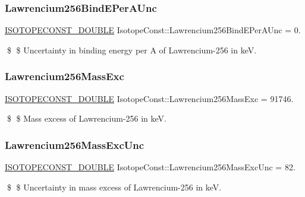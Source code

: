 \subsubsection{\texorpdfstring{Lawrencium256\+Bind\+E\+Per\+A\+Unc}{Lawrencium256BindEPerAUnc}}
{\footnotesize\ttfamily \mbox{\hyperlink{group___isotope_const-_macros_ga8f45a7272ce02c0b4c65c44636ed719a}{I\+S\+O\+T\+O\+P\+E\+C\+O\+N\+S\+T\+\_\+\+D\+O\+U\+B\+LE}} Isotope\+Const\+::\+Lawrencium256\+Bind\+E\+Per\+A\+Unc = 0.}

\$ \$ Uncertainty in binding energy per A of Lawrencium-\/256 in keV. \mbox{\label{group___isotope_const-_lawrencium-_lr256_gaed538e9f60227ca905d1405dfa160ab6}} 
\subsubsection{\texorpdfstring{Lawrencium256\+Mass\+Exc}{Lawrencium256MassExc}}
{\footnotesize\ttfamily \mbox{\hyperlink{group___isotope_const-_macros_ga8f45a7272ce02c0b4c65c44636ed719a}{I\+S\+O\+T\+O\+P\+E\+C\+O\+N\+S\+T\+\_\+\+D\+O\+U\+B\+LE}} Isotope\+Const\+::\+Lawrencium256\+Mass\+Exc = 91746.}

\$ \$ Mass excess of Lawrencium-\/256 in keV. \mbox{\label{group___isotope_const-_lawrencium-_lr256_gad6fe59f8c7d4a4d854e884afe21ad49b}} 
\subsubsection{\texorpdfstring{Lawrencium256\+Mass\+Exc\+Unc}{Lawrencium256MassExcUnc}}
{\footnotesize\ttfamily \mbox{\hyperlink{group___isotope_const-_macros_ga8f45a7272ce02c0b4c65c44636ed719a}{I\+S\+O\+T\+O\+P\+E\+C\+O\+N\+S\+T\+\_\+\+D\+O\+U\+B\+LE}} Isotope\+Const\+::\+Lawrencium256\+Mass\+Exc\+Unc = 82.}

\$ \$ Uncertainty in mass excess of Lawrencium-\/256 in keV. \mbox{\label{group___isotope_const-_lawrencium-_lr256_gaf7639854048fc22890f4ca2b18c29669}} 
